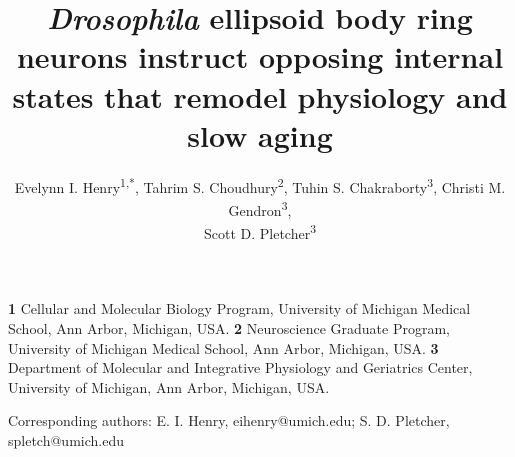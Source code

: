 \title{\textit{Drosophila} ellipsoid body ring neurons instruct opposing internal states that remodel physiology and slow aging}
\author{Evelynn I. Henry\textsuperscript{1,*}, Tahrim S. Choudhury\textsuperscript{2}, Tuhin S. Chakraborty\textsuperscript{3}, Christi M. Gendron\textsuperscript{3},  \\ Scott D. Pletcher\textsuperscript{3}}
\date{} %

\maketitle

\noindent\textbf{1} Cellular and Molecular Biology Program, University of Michigan Medical School, Ann Arbor, Michigan, USA. \textbf{2} Neuroscience Graduate Program, University of Michigan Medical School, Ann Arbor, Michigan, USA. \textbf{3} Department of Molecular and Integrative Physiology and Geriatrics Center, University of Michigan, Ann Arbor, Michigan, USA.

\noindent*Corresponding authors: E. I. Henry, eihenry@umich.edu; S. D. Pletcher, spletch@umich.edu

\newpage
